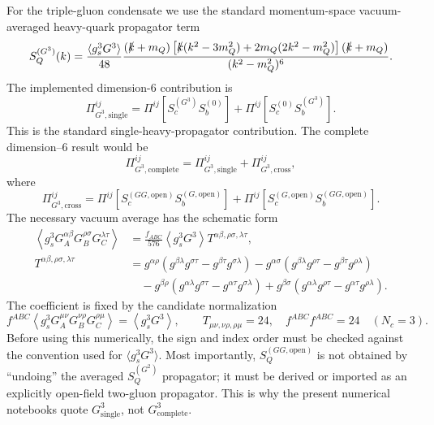 \documentclass[11pt]{article}
\begin{document}
For the triple-gluon condensate we use the standard momentum-space
vacuum-averaged heavy-quark propagator term
\begin{equation}
  S_Q^{(G^3)}(k)
  =
  \frac{\langle g_s^3G^3\rangle}{48}
  \frac{
  (\slashed{k}+m_Q)
  \left[
    \slashed{k}(k^2-3m_Q^2)
    +2m_Q(2k^2-m_Q^2)
  \right]
  (\slashed{k}+m_Q)}
  {(k^2-m_Q^2)^6}.
\end{equation}
The implemented dimension-6 contribution is
\begin{equation}
  \Pi_{G^3,\mathrm{single}}^{ij}
  =
  \Pi^{ij}[S_c^{(G^3)}S_b^{(0)}]
  +
  \Pi^{ij}[S_c^{(0)}S_b^{(G^3)}].
\end{equation}
This is the standard single-heavy-propagator contribution.  The complete
dimension--6 result would be
\begin{equation}
  \Pi_{G^3,\mathrm{complete}}^{ij}
  =
  \Pi_{G^3,\mathrm{single}}^{ij}
  +
  \Pi_{G^3,\mathrm{cross}}^{ij},
\end{equation}
where
\begin{equation}
  \Pi_{G^3,\mathrm{cross}}^{ij}
  =
  \Pi^{ij}[S_c^{(GG,\mathrm{open})}S_b^{(G,\mathrm{open})}]
  +
  \Pi^{ij}[S_c^{(G,\mathrm{open})}S_b^{(GG,\mathrm{open})}].
\end{equation}
The necessary vacuum average has the schematic form
\begin{align}
  \left\langle
    g_s^3G_A^{\alpha\beta}
    G_B^{\rho\sigma}
    G_C^{\lambda\tau}
  \right\rangle
  &=
  \frac{f_{ABC}}{576}
  \left\langle g_s^3G^3\right\rangle
  T^{\alpha\beta,\rho\sigma,\lambda\tau},\\
  T^{\alpha\beta,\rho\sigma,\lambda\tau}
  &=
  g^{\alpha\rho}
  (g^{\beta\lambda}g^{\sigma\tau}
  -g^{\beta\tau}g^{\sigma\lambda})
  -g^{\alpha\sigma}
  (g^{\beta\lambda}g^{\rho\tau}
  -g^{\beta\tau}g^{\rho\lambda})
  \nonumber\\
  &\quad
  -g^{\beta\rho}
  (g^{\alpha\lambda}g^{\sigma\tau}
  -g^{\alpha\tau}g^{\sigma\lambda})
  +g^{\beta\sigma}
  (g^{\alpha\lambda}g^{\rho\tau}
  -g^{\alpha\tau}g^{\rho\lambda}).
\end{align}
The coefficient is fixed by the candidate normalization
\begin{equation}
  f^{ABC}
  \left\langle
    g_s^3G_A^{\mu\nu}G_B^{\nu\rho}G_C^{\rho\mu}
  \right\rangle
  =
  \left\langle g_s^3G^3\right\rangle,
  \qquad
  T_{\mu\nu,\nu\rho,\rho\mu}=24,\quad
  f^{ABC}f^{ABC}=24
  \quad (N_c=3).
\end{equation}
Before using this numerically, the sign and index order must be checked against
the convention used for \(\langle g_s^3G^3\rangle\).  Most importantly,
\(S_Q^{(GG,\mathrm{open})}\) is not obtained by ``undoing'' the averaged
\(S_Q^{(G^2)}\) propagator; it must be derived or imported as an explicitly
open-field two-gluon propagator.  This is why the present numerical notebooks
quote \(G^3_{\mathrm{single}}\), not \(G^3_{\mathrm{complete}}\).
\end{document}
